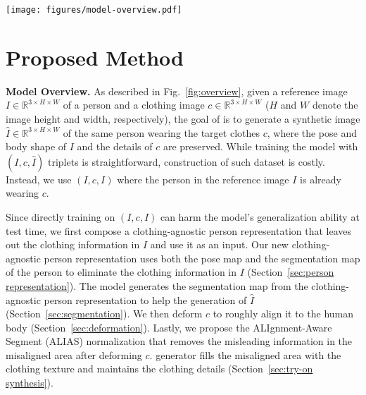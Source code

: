 \begin{figure*}[t!]
    \centering
    \texttt{[image: figures/model-overview.pdf]}
    \vspace{-0.5cm}
    \caption{Overview of a \model. (a) First, given a reference image $I$ containing a target person, we predict the segmentation map $S$ and the pose map $P$, and utilize them to pre-process $I$ and $S$ as a clothing-agnostic person image $I_a$ and segmentation $S_a$. (b) Segmentation generator produces the synthetic segmentation $\hat{S}$ from $(S_a, P, c)$. (c) Geometric matching module deforms the clothing image $c$ according to the predicted clothing segmentation $\hat{S_c}$ extracted from $\hat{S}$. (d) Finally, \norm generator synthesizes the final output image $\hat{I}$ based on the outputs from the previous stages via our \norm normalization.}
    \vspace{-0.4cm}
    \label{fig:overview}
\end{figure*}

\section{Proposed Method}
\textbf{Model Overview.}
As described in Fig.~\ref{fig:overview}, given a reference image $I \in \mathbb{R}^{3 \times H \times W}$ of a person and a clothing image $c \in \mathbb{R}^{3 \times H \times W}$ ($H$ and $W$ denote the image height and width, respectively), the goal of \model is to generate a synthetic image $\hat{I} \in \mathbb{R}^{3 \times H \times W}$ of the same person wearing the target clothes $c$, where the pose and body shape of $I$ and the details of $c$ are preserved.
While training the model with $(I, c, \hat{I})$ triplets is straightforward, construction of such dataset is costly.
Instead, we use $(I, c, I)$ where the person in the reference image $I$ is already wearing $c$.

Since directly training on $(I, c, I)$ can harm the model's generalization ability at test time, we first compose a clothing-agnostic person representation that leaves out the clothing information in $I$ and use it as an input.
Our new clothing-agnostic person representation uses both the pose map and the segmentation map of the person to eliminate the clothing information in $I$ (Section~\ref{sec:person representation}).
The model generates the segmentation map from the clothing-agnostic person representation to help the generation of $\hat{I}$ (Section~\ref{sec:segmentation}).
We then deform $c$ to roughly align it to the human body (Section~\ref{sec:deformation}).
Lastly, we propose the ALIgnment-Aware Segment (ALIAS) normalization that removes the misleading information in the misaligned area after deforming $c$.
\norm generator fills the misaligned area with the clothing texture and maintains the clothing details (Section~\ref{sec:try-on synthesis}).


